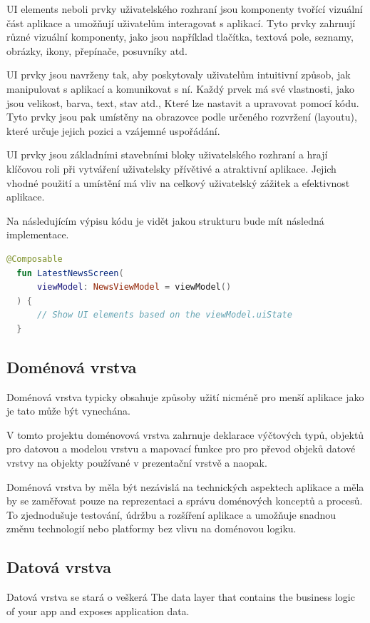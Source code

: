 UI elements neboli prvky uživatelského rozhraní jsou komponenty tvořící vizuální část aplikace a umožňují uživatelům interagovat s aplikací.
Tyto prvky zahrnují různé vizuální komponenty, jako jsou například tlačítka, textová pole, seznamy, obrázky, ikony, přepínače, posuvníky atd.

UI prvky jsou navrženy tak, aby poskytovaly uživatelům intuitivní způsob, jak manipulovat s aplikací a komunikovat s ní. Každý prvek má své 
vlastnosti, jako jsou velikost, barva, text, stav atd., Které lze nastavit a upravovat pomocí kódu. Tyto prvky jsou pak umístěny na obrazovce 
podle určeného rozvržení (layoutu), které určuje jejich pozici a vzájemné uspořádání.

UI prvky jsou základními stavebními bloky uživatelského rozhraní a hrají klíčovou roli při vytváření uživatelsky přívětivé a atraktivní aplikace. 
Jejich vhodné použití a umístění má vliv na celkový uživatelský zážitek a efektivnost aplikace.


\bigskip

Na následujícím výpisu kódu je vidět jakou strukturu bude mít následná implementace.

\begin{lstlisting}[caption={Popis UI widgetů pomocí jazyka Kotlin}, label={lst:ConsumeUIState}, language=Kotlin]
  @Composable
  fun LatestNewsScreen(
      viewModel: NewsViewModel = viewModel()
  ) {
      // Show UI elements based on the viewModel.uiState
  }
\end{lstlisting}

\subsection*{Doménová vrstva}
Doménová vrstva typicky obsahuje způsoby užití nicméně pro menší aplikace jako je tato může být vynechána. 

V tomto projektu doménovová vrstva zahrnuje deklarace výčtových typů, objektů pro datovou a modelou vrstvu a mapovací funkce pro pro převod
objeků datové vrstvy na objekty používané v prezentační vrstvě a naopak.

Doménová vrstva by měla být nezávislá na technických aspektech aplikace a měla by se zaměřovat pouze na reprezentaci a správu doménových
 konceptů a procesů. To zjednodušuje testování, údržbu a rozšíření aplikace a umožňuje snadnou změnu technologií nebo platformy bez 
 vlivu na doménovou logiku.

\subsection*{Datová vrstva}
Datová vrstva se stará o veškerá 
The data layer that contains the business logic of your app and exposes application data.


